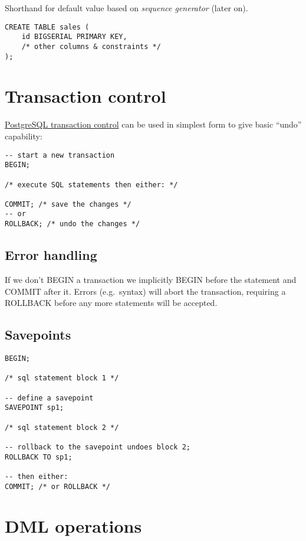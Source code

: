 \documentclass[slides]{pgnotes}
\begin{document}
Shorthand for default value based on \textit{sequence generator} (later on).

\begin{verbatim}
CREATE TABLE sales ( 
    id BIGSERIAL PRIMARY KEY,
    /* other columns & constraints */
);
\end{verbatim}


\section{Transaction control}
\label{sec:transaction-control}

\href{https://www.postgresql.org/docs/15/tutorial-transactions.html}{PostgreSQL
transaction control} can be used in simplest form to give basic ``undo''
capability:

\begin{verbatim}
-- start a new transaction
BEGIN;

/* execute SQL statements then either: */

COMMIT; /* save the changes */
-- or
ROLLBACK; /* undo the changes */
\end{verbatim}

\subsection{Error handling}
\label{sec:error-handling}

If we don't BEGIN a transaction we implicitly BEGIN before the statement
and COMMIT after it. Errors (e.g.~syntax) will abort the transaction,
requiring a ROLLBACK before any more statements will be accepted.

\subsection{Savepoints}\label{savepoints}

\begin{verbatim}
BEGIN;

/* sql statement block 1 */

-- define a savepoint
SAVEPOINT sp1;

/* sql statement block 2 */

-- rollback to the savepoint undoes block 2; 
ROLLBACK TO sp1;

-- then either:
COMMIT; /* or ROLLBACK */
\end{verbatim}

\section{DML operations}
\end{document}
